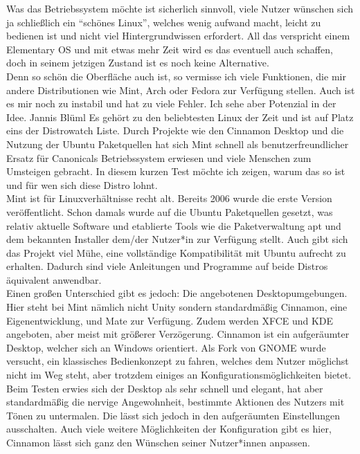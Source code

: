 {{	Was das Betriebssystem möchte ist sicherlich sinnvoll, viele Nutzer wünschen sich ja schließlich ein "`schönes Linux"', welches wenig aufwand macht, leicht zu bedienen ist und nicht viel Hintergrundwissen erfordert. All das verspricht einem Elementary OS und mit etwas mehr Zeit wird es das eventuell auch schaffen, doch in seinem jetzigen Zustand ist es noch keine Alternative. \\	
	Denn so schön die Oberfläche auch ist, so vermisse ich viele Funktionen, die mir andere Distributionen wie Mint, Arch oder Fedora zur Verfügung stellen. Auch ist es mir noch zu instabil und hat zu viele Fehler. Ich sehe aber Potenzial in der Idee. }
	{Jannis Blüml}
	{Es gehört zu den beliebtesten Linux der Zeit und ist auf Platz eins der Distrowatch Liste. Durch Projekte wie den Cinnamon Desktop und
	die Nutzung der Ubuntu Paketquellen hat sich Mint schnell als benutzerfreundlicher Ersatz für Canonicals Betriebssystem erwiesen
	und viele Menschen zum Umsteigen gebracht. In diesem kurzen Test möchte ich zeigen, warum das so ist und für wen sich diese Distro lohnt.\\
	Mint ist für Linuxverhältnisse recht alt. Bereits 2006 wurde die erste Version veröffentlicht. Schon damals wurde auf die Ubuntu Paketquellen
	gesetzt, was relativ aktuelle Software und etablierte Tools wie die Paketverwaltung apt und dem bekannten Installer 
	dem/der Nutzer*in zur Verfügung stellt. Auch gibt sich das Projekt viel Mühe, eine vollständige Kompatibilität mit Ubuntu aufrecht zu erhalten.
	Dadurch sind viele Anleitungen und Programme auf beide Distros
	äquivalent anwendbar.\\
	Einen großen Unterschied gibt es jedoch: Die angebotenen Desktopumgebungen. Hier steht bei Mint nämlich nicht Unity sondern standardmäßig
	Cinnamon, eine Eigenentwicklung, und Mate zur Verfügung. Zudem werden XFCE und KDE angeboten, aber meist mit größerer Verzögerung.
	Cinnamon ist ein aufgeräumter Desktop, welcher sich an Windows orientiert. Als Fork von GNOME wurde versucht, ein klassisches Bedienkonzept
	zu fahren, welches dem Nutzer möglichst nicht im Weg steht, aber trotzdem einiges an Konfigurationsmöglichkeiten bietet. Beim Testen erwies
	sich der Desktop als sehr schnell und elegant, hat aber standardmäßig die nervige Angewohnheit, bestimmte Aktionen des Nutzers mit Tönen zu
	untermalen. Die lässt sich jedoch in den aufgeräumten Einstellungen ausschalten. Auch viele weitere Möglichkeiten der Konfiguration gibt es
	hier, Cinnamon lässt sich ganz den Wünschen seiner Nutzer*innen anpassen.\\
}}
